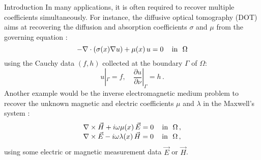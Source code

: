 \documentclass[11pt]{article}%
\renewcommand{\_}{{\fontfamily{ptm}\selectfont\textunderscore}}
\theoremstyle{plain}
\numberwithin{equation}{section}
\newcommand{\R}{\mathbb{R}}
\newcommand{\q}{\quad}   \newcommand{\qq}{\qquad} \def\R{{\mathbb R}} \def\l{\label}
\begin{document}
\begin{section}{Introduction}
In many applications, it is often required to recover multiple coefficients simultaneously. For instance, 
the diffusive optical tomography (DOT) aims at recovering the diffusion and absorption coefficients $\sigma$ and $\mu$ 
from the governing equation \cite{arridge1999optical, gibson2005recent}:
\begin{equation} \label{dot}
-\nabla\cdot (\sigma(x) \nabla u)+\mu(x)\,u=0\, \q \mbox{in} ~~\Om
\end{equation}
using the Cauchy data $(f, h)$ collected at the boundary $\Gamma$ of $\Omega$:
\begin{equation} \label{bdr}
u|_\Gamma=f,\quad\frac{\partial u}{\partial \nu}|_\Gamma=h\,.
\end{equation}
Another example would be the inverse electromagnetic medium problem 
to recover the unknown magnetic and electric coefficients $\mu$ and $\lambda$ in the Maxwell's system \cite{dorn1999nonlinear, bao2005inverse}:
$$\begin{array}{l}
\nabla \times \vec{H}+i\omega \mu(x)\,\vec{E}=0\, \q \mbox{in} ~~\Om\,,
\\ 
\nabla \times \vec{E}-i\omega \lambda(x)\,\vec{H}=0 \, \q \mbox{in} ~~\Om\,, 
\end{array}$$
using some electric or magnetic measurement data $\vec{E}$ or $\vec{H}$. 




\end{section}
\end{document}
